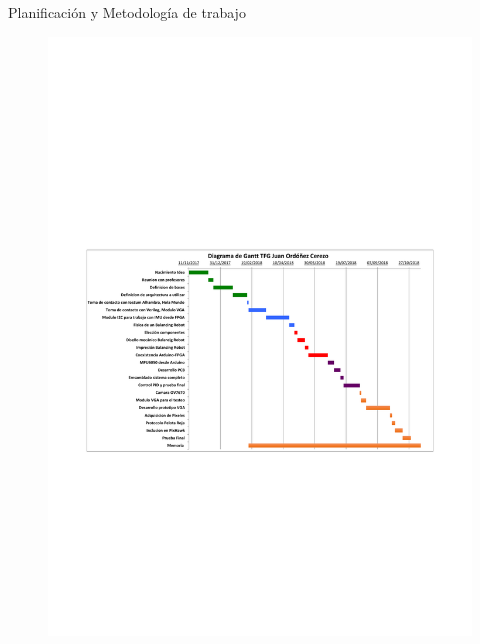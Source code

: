 \documentclass{beamer}
\begin{document}
\begin{frame}{Planificación y Metodología de trabajo}
	\begin{center}
		\begin{figure}[H]
			\center
			\includegraphics[trim = 1.3cm 0mm 0mm 10.5cm,clip, angle=0, scale = 0.65]{imagenes/Introduction/Gantt.pdf}

		\end{figure}
	\end{center}
\end{frame}
\end{document}
